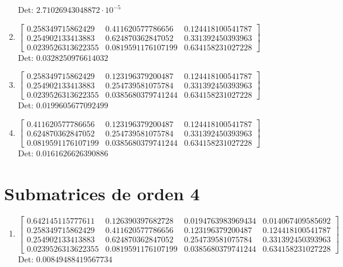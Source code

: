 \documentclass[12pt]{article}
\begin{document}
\begin{enumerate}
Det: $2.71026943048872 \cdot 10^{-5}$\\

\item $\displaystyle \left[\begin{matrix}0.258349715862429 & 0.411620577786656 & 0.124418100541787\\0.254902133413883 & 0.624870362847052 & 0.331392450393963\\0.0239526313622355 & 0.0819591176107199 & 0.634158231027228\end{matrix}\right]$\\

Det: $0.0328250976614032$\\

\item $\displaystyle \left[\begin{matrix}0.258349715862429 & 0.123196379200487 & 0.124418100541787\\0.254902133413883 & 0.254739581075784 & 0.331392450393963\\0.0239526313622355 & 0.0385680379741244 & 0.634158231027228\end{matrix}\right]$\\

Det: $0.0199605677092499$\\

\item $\displaystyle \left[\begin{matrix}0.411620577786656 & 0.123196379200487 & 0.124418100541787\\0.624870362847052 & 0.254739581075784 & 0.331392450393963\\0.0819591176107199 & 0.0385680379741244 & 0.634158231027228\end{matrix}\right]$\\

Det: $0.0161626626390886$\\

\end{enumerate}


\section*{Submatrices de orden 4}

\begin{enumerate}

\item $\displaystyle \left[\begin{matrix}0.642145115777611 & 0.126390397682728 & 0.0194763983969434 & 0.014067409585692\\0.258349715862429 & 0.411620577786656 & 0.123196379200487 & 0.124418100541787\\0.254902133413883 & 0.624870362847052 & 0.254739581075784 & 0.331392450393963\\0.0239526313622355 & 0.0819591176107199 & 0.0385680379741244 & 0.634158231027228\end{matrix}\right]$\\

Det: $0.00849488419567734$\\

\end{enumerate}
\end{document}
